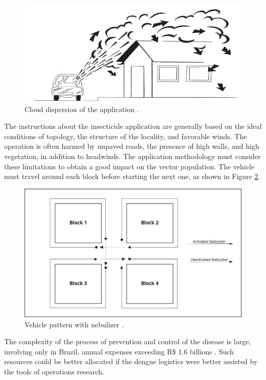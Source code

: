 \documentclass[a4paper,11pt]{article}
\begin{document}
\begin{figure}[!ht]
  \centering
  \includegraphics[scale=0.4]{cloud-dispersion.png}
  \caption{Cloud dispersion of the application \citep{brasil-dept-helth:2009}.}
  \label{fig:dispersion}
\end{figure}

The instructions  about the insecticide  application are generally based  on the
ideal  conditions of  topology, the  structure  of the  locality, and  favorable
winds. The  operation is  often harmed  by unpaved roads,  the presence  of high
walls,  and  high   vegetation,  in  addition  to   headwinds.  The  application
methodology  must consider  these limitations  to obtain  a good  impact on  the
vector population. The vehicle must travel around each block before starting the
next one, as shown in Figure \ref{fig:travel-pattern}.

\begin{figure}[!ht]
  \centering
  \includegraphics[scale=0.25]{visit-pattern.jpg}
  \caption{Vehicle pattern with nebulizer \cite{brasil-dept-helth:2009}.}
  \label{fig:travel-pattern}
\end{figure}

The complexity of the process of prevention and control of the disease is large,
involving  only  in  Brazil,  annual   expenses  exceeding  R$\$$  1.6  billions
\citep{negreiros-2020}. Such resources  could be better allocated  if the dengue
logistics were better assisted by the tools of operations research.
\end{document}
